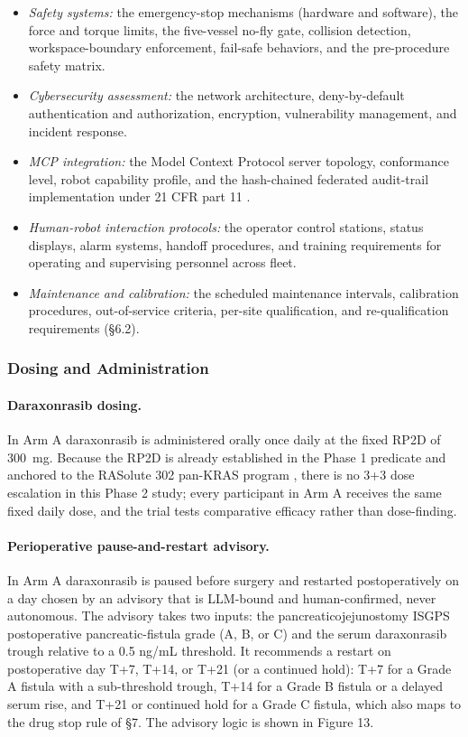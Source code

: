 \begin{itemize}[leftmargin=1.4em,itemsep=1pt,topsep=2pt]
rehearsal and intra-operative guidance.
\item[(vii)] \textit{Safety systems:} the emergency-stop mechanisms (hardware and
software), the force and torque limits, the five-vessel no-fly gate, collision
detection, workspace-boundary enforcement, fail-safe behaviors, and the
pre-procedure safety matrix.
\item[(viii)] \textit{Cybersecurity assessment:} the network architecture,
deny-by-default authentication and authorization, encryption, vulnerability
management, and incident response.
\item[(ix)] \textit{MCP integration:} the Model Context Protocol server topology,
conformance level, robot capability profile, and the hash-chained federated
audit-trail implementation under 21 CFR part 11 \cite{ecfr2026part11}.
\item[(x)] \textit{Human-robot interaction protocols:} the operator control
stations, status displays, alarm systems, handoff procedures, and training
requirements for operating and supervising personnel across fleet.
\item[(xi)] \textit{Maintenance and calibration:} the scheduled maintenance
intervals, calibration procedures, out-of-service criteria, per-site qualification,
and re-qualification requirements (\S6.2).
\end{itemize}

\subsubsection{Dosing and Administration}

\paragraph{Daraxonrasib dosing.}
In Arm A daraxonrasib is administered orally once daily at the fixed RP2D of 300~mg.
Because the RP2D is already established in the Phase 1 predicate and anchored to the
RASolute 302 pan-KRAS program \cite{kawchak2026phase1,rasolute302}, there is no 3+3
dose escalation in this Phase 2 study; every participant in Arm A receives the same
fixed daily dose, and the trial tests comparative efficacy rather than dose-finding.

\paragraph{Perioperative pause-and-restart advisory.}
In Arm A daraxonrasib is paused before surgery and restarted postoperatively on a
day chosen by an advisory that is LLM-bound and human-confirmed, never autonomous.
The advisory takes two inputs: the pancreaticojejunostomy ISGPS postoperative
pancreatic-fistula grade (A, B, or C) \cite{Bassi2017} and the serum daraxonrasib
trough relative to a 0.5 ng/mL threshold. It recommends a restart on postoperative
day T+7, T+14, or T+21 (or a continued hold): T+7 for a Grade A fistula with a
sub-threshold trough, T+14 for a Grade B fistula or a delayed serum rise, and T+21
or continued hold for a Grade C fistula, which also maps to the drug stop rule of
\S7. The advisory logic is shown in Figure 13.


